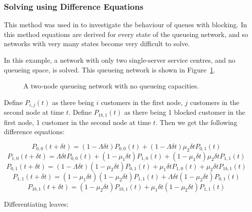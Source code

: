 \documentclass{article}
\begin{document}
\subsubsection{Solving using Difference Equations}
This method was used in \cite{baber08} to investigate the behaviour of queues with blocking.
In this method equations are derived for every state of the queueing network, and so networks with very many states become very difficult to solve.

In this example, a network with only two single-server service centres, and no queueing space, is solved.
This queueing network is shown in Figure~\ref{fig:2nodesNoQs}.

\begin{figure}[H]
    
    \caption{A two-node queueing network with no queueing capacities.}
    \label{fig:2nodesNoQs}
\end{figure}

Define $P_{i,j}(t)$ as there being $i$ customers in the first node, $j$ customers in the second node at time $t$.
Define $P_{1b,1}(t)$ as there being 1 blocked customer in the first node, 1 customer in the second node at time $t$.
Then we get the following difference equations:

\begin{equation*}
    P_{0,0}(t+\delta t) = (1 - \Lambda \delta t)P_{0,0}(t) + (1 - \Lambda \delta t)\mu_2 \delta t P_{0,1}(t)
\end{equation*}
\begin{equation*}
    P_{1,0}(t+\delta t) = \Lambda \delta t P_{0,0}(t) + (1 - \mu_1 \delta t) P_{1,0}(t) + (1 - \mu_1 \delta t)\mu_2 \delta t P_{1,1}(t)
\end{equation*}
\begin{equation*}
    P_{0,1}(t+\delta t) = (1 - \Lambda \delta t)(1 - \mu_2 \delta t)P_{0,1}(t) + \mu_1 \delta t P_{1,0}(t) + \mu_2 \delta t P_{1b,1}(t)
\end{equation*}
\begin{equation*}
    P_{1,1}(t+\delta t) = (1 - \mu_1 \delta t)(1 - \mu_2 \delta t)P_{1,1}(t) + \Lambda \delta t (1 - \mu_2 \delta t) P_{0,1}(t)
\end{equation*}
\begin{equation*}
    P_{1b,1}(t+\delta t) = (1 - \mu_2 \delta t)P_{1b,1}(t) + \mu_1 \delta t (1 - \mu_2 \delta t)P_{1,1}(t)
\end{equation*}

Differentiating leaves:
\end{document}
